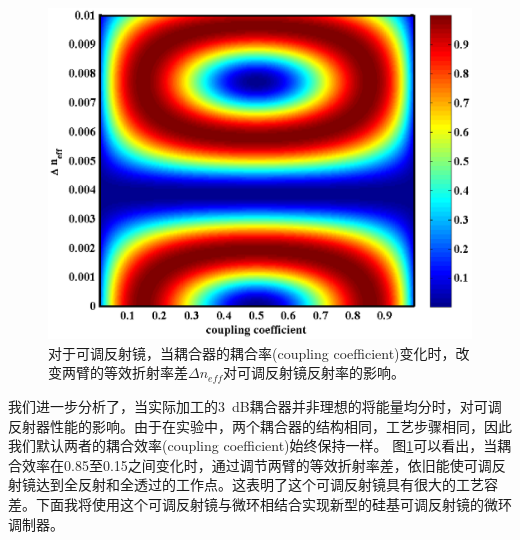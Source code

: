 \begin{figure}[htb]
	\centering
	\includegraphics[width=15cm]{./Pictures/chapt5_grating_ring_real_3dB.eps}
	\caption{对于可调反射镜，当耦合器的耦合率(coupling coefficient)变化时，改变两臂的等效折射率差$\Delta n_{eff}$对可调反射镜反射率的影响。}
	\label{chapt5_grating_ring_real_3dB}
\end{figure}
我们进一步分析了，当实际加工的3~dB耦合器并非理想的将能量均分时，对可调反射器性能的影响。由于在实验中，两个耦合器的结构相同，工艺步骤相同，因此我们默认两者的耦合效率(coupling coefficient)始终保持一样。 图\ref{chapt5_grating_ring_real_3dB}可以看出，当耦合效率在0.85至0.15之间变化时，通过调节两臂的等效折射率差，依旧能使可调反射镜达到全反射和全透过的工作点。这表明了这个可调反射镜具有很大的工艺容差。下面我将使用这个可调反射镜与微环相结合实现新型的硅基可调反射镜的微环调制器。

